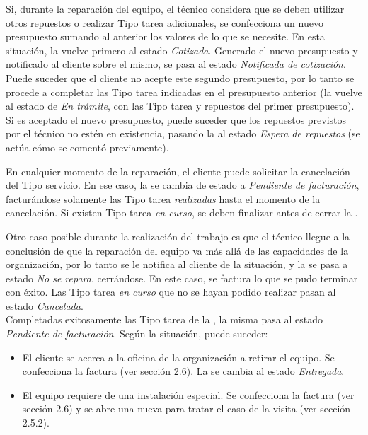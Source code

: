\documentclass[12pt]{extarticle}
\begin{document}
\begin{spacing}{1.2}
    Si, durante la reparación del equipo, el técnico considera que se deben utilizar otros repuestos o realizar Tipo tarea adicionales, se confecciona un nuevo presupuesto sumando al anterior los valores de lo que se necesite. En esta situación, la \OT{} vuelve primero al estado \textit{Cotizada}. Generado el nuevo presupuesto y notificado al cliente sobre el mismo, se pasa al estado \textit{Notificada de cotización}. Puede suceder que el cliente no acepte este segundo presupuesto, por lo tanto se procede a completar las Tipo tarea indicadas en el presupuesto anterior (la \OT{} vuelve al estado de \textit{En trámite}, con las Tipo tarea y repuestos del primer presupuesto). Si es aceptado el nuevo presupuesto, puede suceder que los repuestos previstos por el técnico no estén en existencia, pasando la \OT{} al estado \textit{Espera de repuestos} (se actúa cómo se comentó previamente).
    
    En cualquier momento de la reparación, el cliente puede solicitar la cancelación del Tipo servicio. En ese caso, la \OT{} se cambia de estado a \textit{Pendiente de facturación}, facturándose solamente las Tipo tarea \textit{realizadas} hasta el momento de la cancelación. Si existen Tipo tarea \textit{en curso}, se deben finalizar antes de cerrar la \OT{}.
    
    Otro caso posible durante la realización del trabajo es que el técnico llegue a la conclusión de que la reparación del equipo va más allá de las capacidades de la organización, por lo tanto se le notifica al cliente de la situación, y la \OT{} se pasa a estado \textit{No se repara}, cerrándose. En este caso, se factura lo que se pudo terminar con éxito. Las Tipo tarea \textit{en curso} que no se hayan podido realizar pasan al estado \textit{Cancelada}.\\

    Completadas exitosamente las Tipo tarea de la \OT{}, la misma pasa al estado \textit{Pendiente de facturación}. Según la situación, puede suceder:
    \begin{itemize}
        \item El cliente se acerca a la oficina de la organización a retirar el equipo. Se confecciona la factura (ver sección 2.6). La \OT{} se cambia al estado \textit{Entregada}.
        \item El equipo requiere de una instalación especial. Se confecciona la factura (ver sección 2.6) y se abre una nueva \OT{} para tratar el caso de la visita (ver sección 2.5.2).
    \end{itemize}


\end{spacing}
\end{document}
